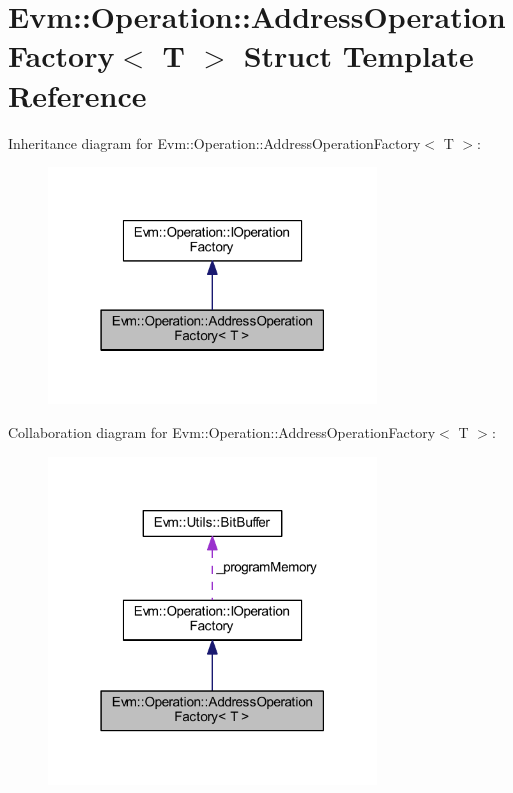 \hypertarget{struct_evm_1_1_operation_1_1_address_operation_factory}{}\section{Evm\+:\+:Operation\+:\+:Address\+Operation\+Factory$<$ T $>$ Struct Template Reference}
\label{struct_evm_1_1_operation_1_1_address_operation_factory}


Inheritance diagram for Evm\+:\+:Operation\+:\+:Address\+Operation\+Factory$<$ T $>$\+:
\nopagebreak
\begin{figure}[H]
\begin{center}
\leavevmode
\includegraphics[width=247pt]{struct_evm_1_1_operation_1_1_address_operation_factory__inherit__graph}
\end{center}
\end{figure}


Collaboration diagram for Evm\+:\+:Operation\+:\+:Address\+Operation\+Factory$<$ T $>$\+:
\nopagebreak
\begin{figure}[H]
\begin{center}
\leavevmode
\includegraphics[width=247pt]{struct_evm_1_1_operation_1_1_address_operation_factory__coll__graph}
\end{center}
\end{figure}

